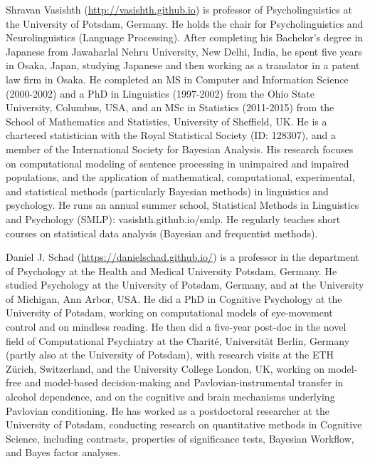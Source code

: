 \documentclass[12pt,]{krantz}
\begin{document}
Shravan Vasishth (\url{http://vasishth.github.io}) is professor of Psycholinguistics at the University of Potsdam, Germany. He holds the chair for Psycholinguistics and Neurolinguistics (Language Processing). After completing his Bachelor's degree in Japanese from Jawaharlal Nehru University, New Delhi, India, he spent five years in Osaka, Japan, studying Japanese and then working as a translator in a patent law firm in Osaka. He completed an MS in Computer and Information Science (2000-2002) and a PhD in Linguistics (1997-2002) from the Ohio State University, Columbus, USA, and an MSc in Statistics (2011-2015) from the School of Mathematics and Statistics, University of Sheffield, UK. He is a chartered statistician with the Royal Statistical Society (ID: 128307), and a member of the International Society for Bayesian Analysis. His research focuses on computational modeling of sentence processing in unimpaired and impaired populations, and the application of mathematical, computational, experimental, and statistical methods (particularly Bayesian methods) in linguistics and psychology. He runs an annual summer school, Statistical Methods in Linguistics and Psychology (SMLP): vasishth.github.io/smlp. He regularly teaches short courses on statistical data analysis (Bayesian and frequentist methods).

Daniel J. Schad (\url{https://danielschad.github.io/}) is a professor in the department of Psychology at the Health and Medical University Potsdam, Germany. He studied Psychology at the University of Potsdam, Germany, and at the University of Michigan, Ann Arbor, USA. He did a PhD in Cognitive Psychology at the University of Potsdam, working on computational models of eye-movement control and on mindless reading. He then did a five-year post-doc in the novel field of Computational Psychiatry at the Charité, Universität Berlin, Germany (partly also at the University of Potsdam), with research visits at the ETH Zürich, Switzerland, and the University College London, UK, working on model-free and model-based decision-making and Pavlovian-instrumental transfer in alcohol dependence, and on the cognitive and brain mechanisms underlying Pavlovian conditioning. He has worked as a postdoctoral researcher at the University of Potsdam, conducting research on quantitative methods in Cognitive Science, including contrasts, properties of significance tests, Bayesian Workflow, and Bayes factor analyses.
\end{document}
